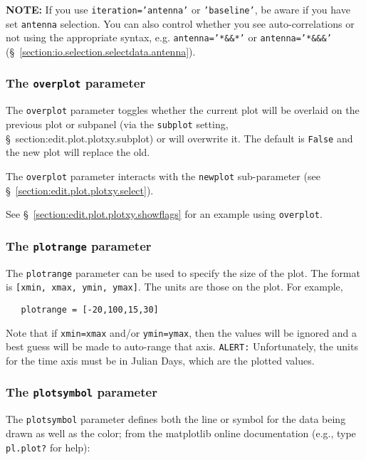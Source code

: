 {\bf NOTE:} If you use {\tt iteration='antenna'} or {\tt 'baseline'},
be aware if you have set {\tt antenna} selection.  You can also
control whether you see auto-correlations or not using the appropriate
syntax, e.g. {\tt antenna='*\&\&*'} or {\tt antenna='*\&\&\&'}
(\S~\ref{section:io.selection.selectdata.antenna}).

\subsubsection{ The {\tt overplot} parameter}
\label{section:edit.plot.plotxy.overplot}

The {\tt overplot} parameter toggles whether the current plot will
be overlaid on the previous plot or subpanel (via the {\tt subplot}
setting, \S~{section:edit.plot.plotxy.subplot}) or will overwrite it.
The default is {\tt False} and the new plot will replace the old.

The {\tt overplot} parameter interacts with the {\tt newplot}
sub-parameter (see \S~\ref{section:edit.plot.plotxy.select}).

See \S~\ref{section:edit.plot.plotxy.showflags} for an example using 
{\tt overplot}. 

\subsubsection{ The {\tt plotrange} parameter}
\label{section:edit.plot.plotxy.plotrange}

The {\tt plotrange} parameter can be used to specify the size of the
plot.  The format is {\tt [xmin, xmax, ymin, ymax]}.  The units are
those on the plot.  For example,
\small
\begin{verbatim}
   plotrange = [-20,100,15,30]
\end{verbatim}
\normalsize
Note that if {\tt xmin=xmax} and/or {\tt ymin=ymax}, then the values
will be ignored and a best guess will be made to auto-range that axis.
{\tt ALERT:} Unfortunately, the units for the time axis must be
in Julian Days, which are the plotted values.

\subsubsection{ The {\tt plotsymbol} parameter}
\label{section:edit.plot.plotxy.symb}

The {\tt plotsymbol} parameter defines both the line or
symbol for the data being drawn as well as the color; from the
matplotlib online documentation (e.g., type {\tt pl.plot?} for help):


